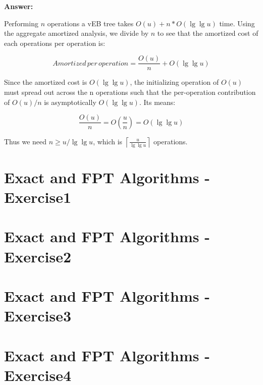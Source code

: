 \documentclass[12pt]{article}
\begin{document}
\textbf{Answer:}

Performing $n$ operations a vEB tree takes $O(u) + n*O(\lg\lg u)$ time. Using the aggregate amortized analysis, we divide by $n$ to see that the amortized cost of each operations  per operation is:

\begin{equation}
Amortized \, per \, operation = \frac{O(u)}{n} + O(\lg\lg u) 
\end{equation} 

Since the amortized cost is $O(\lg \lg u)$, the initializing operation of $O(u)$ must spread out across  the n operations such that the per-operation contribution of $O(u)/n$ is asymptotically $O(\lg \lg u)$. Its means:

\begin{equation}
\frac{O(u)}{n}=O(\frac{u}{n}) = O( \lg \lg u)
\end{equation}

Thus we need $n \ge u/ \lg \lg u$, which is $\displaystyle \left \lceil \frac{u}{\lg\lg u} \right \rceil$ operations.


\section{Exact and FPT Algorithms - Exercise1}

\section{Exact and FPT Algorithms - Exercise2}

\section{Exact and FPT Algorithms - Exercise3}

\section{Exact and FPT Algorithms - Exercise4}
\end{document}
